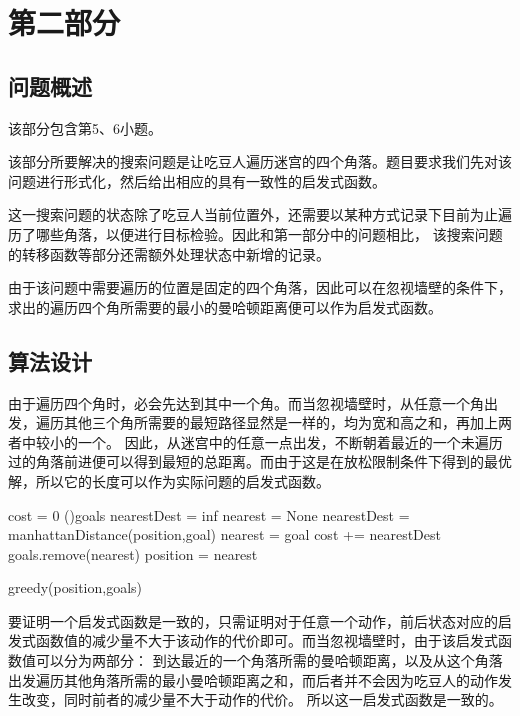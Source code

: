\chapter{第二部分}
\section{问题概述}
%
%
%
%
%
%
该部分包含第5、6小题。

该部分所要解决的搜索问题是让吃豆人遍历迷宫的四个角落。题目要求我们先对该问题进行形式化，然后给出相应的具有一致性的启发式函数。

这一搜索问题的状态除了吃豆人当前位置外，还需要以某种方式记录下目前为止遍历了哪些角落，以便进行目标检验。因此和第一部分中的问题相比，
该搜索问题的转移函数等部分还需额外处理状态中新增的记录。

由于该问题中需要遍历的位置是固定的四个角落，因此可以在忽视墙壁的条件下， 求出的遍历四个角所需要的最小的曼哈顿距离便可以作为启发式函数。
\section{算法设计}
%
%
由于遍历四个角时，必会先达到其中一个角。而当忽视墙壁时，从任意一个角出发，遍历其他三个角所需要的最短路径显然是一样的，均为宽和高之和，再加上两者中较小的一个。
因此，从迷宫中的任意一点出发，不断朝着最近的一个未遍历过的角落前进便可以得到最短的总距离。而由于这是在放松限制条件下得到的最优解，所以它的长度可以作为实际问题的启发式函数。

\begin{procedure}
    cost = 0\;
    \While(){goals}
    {
        nearestDest = inf\;
        nearest = None\;
        {
            {
                nearestDest = manhattanDistance(position,goal)\;
                nearest = goal
            }
        }
        cost += nearestDest\;
        goals.remove(nearest)\;
        position = nearest\;
    }
    \caption{greedy(position,goals)}
\end{procedure}

要证明一个启发式函数是一致的，只需证明对于任意一个动作，前后状态对应的启发式函数值的减少量不大于该动作的代价即可。而当忽视墙壁时，由于该启发式函数值可以分为两部分：
到达最近的一个角落所需的曼哈顿距离，以及从这个角落出发遍历其他角落所需的最小曼哈顿距离之和，而后者并不会因为吃豆人的动作发生改变，同时前者的减少量不大于动作的代价。
所以这一启发式函数是一致的。
